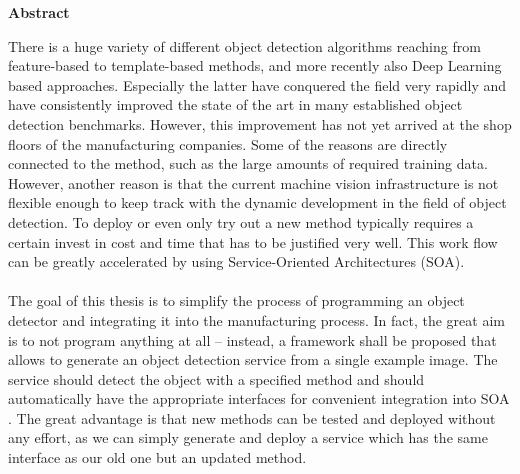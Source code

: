 \thispagestyle{empty}
\vspace*{1.0cm}

\begin{center}
    \textbf{Abstract}
\end{center}

\vspace*{0.5cm}

\noindent
There is a huge variety of different object detection algorithms reaching from feature-based to template-based methods, and more recently also Deep Learning based approaches. Especially the latter have conquered the field very rapidly and have consistently improved the state of the art in many established object detection benchmarks. However, this improvement has not yet arrived at the shop floors of the manufacturing companies. Some of the reasons are directly connected to the method, such as the large amounts of required training data. However, another reason is that the current machine vision infrastructure is not flexible enough to keep track with the dynamic development in the field of object detection. To deploy or even only try out a new method typically requires a certain invest in cost and time that has to be justified very well. This work flow can be greatly accelerated by using Service-Oriented Architectures (SOA).
\\
\\
The goal of this thesis is to simplify the process of programming an object detector and integrating it into the manufacturing process. In fact, the great aim is to not program anything at all – instead, a framework shall be proposed that allows to generate an object detection service from a single example image.
The service should detect the object with a specified method and should automatically have the appropriate interfaces for convenient integration into SOA . The great advantage is that new methods can be tested and deployed without any effort, as we can simply generate and deploy a service which has the same interface as our old one but an updated method.
 
